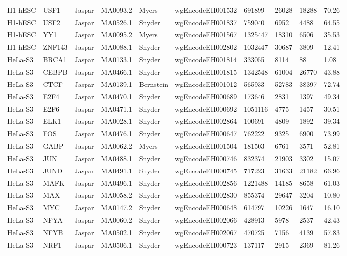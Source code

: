 {\begin{longtable}{p{1.1cm}p{1.0cm}p{1.0cm}p{1.0cm}p{1.0cm}p{2.3cm}p{1.0cm}p{0.8cm}p{0.8cm}p{0.8cm}}
H1-hESC & USF1 & Jaspar & MA0093.2 & Myers & wgEncodeEH001532 & 691899 & 26028 & 18288 & 70.26\\
H1-hESC & USF2 & Jaspar & MA0526.1 & Snyder & wgEncodeEH001837 & 759040 & 6952 & 4488 & 64.55\\
H1-hESC & YY1 & Jaspar & MA0095.2 & Myers & wgEncodeEH001567 & 1325447 & 18310 & 6506 & 35.53\\
H1-hESC & ZNF143 & Jaspar & MA0088.1 & Snyder & wgEncodeEH002802 & 1032447 & 30687 & 3809 & 12.41\\
HeLa-S3 & BRCA1 & Jaspar & MA0133.1 & Snyder & wgEncodeEH001814 & 333055 & 8114 & 88 & 1.08\\
HeLa-S3 & CEBPB & Jaspar & MA0466.1 & Snyder & wgEncodeEH001815 & 1342548 & 61004 & 26770 & 43.88\\
HeLa-S3 & CTCF & Jaspar & MA0139.1 & Bernstein & wgEncodeEH001012 & 565933 & 52783 & 38397 & 72.74\\
HeLa-S3 & E2F4 & Jaspar & MA0470.1 & Snyder & wgEncodeEH000689 & 173646 & 2831 & 1397 & 49.34\\
HeLa-S3 & E2F6 & Jaspar & MA0471.1 & Snyder & wgEncodeEH000692 & 1051116 & 4775 & 1457 & 30.51\\
HeLa-S3 & ELK1 & Jaspar & MA0028.1 & Snyder & wgEncodeEH002864 & 100691 & 4809 & 1892 & 39.34\\
HeLa-S3 & FOS & Jaspar & MA0476.1 & Snyder & wgEncodeEH000647 & 762222 & 9325 & 6900 & 73.99\\
HeLa-S3 & GABP & Jaspar & MA0062.2 & Myers & wgEncodeEH001504 & 181503 & 6761 & 3571 & 52.81\\
HeLa-S3 & JUN & Jaspar & MA0488.1 & Snyder & wgEncodeEH000746 & 832374 & 21903 & 3302 & 15.07\\
HeLa-S3 & JUND & Jaspar & MA0491.1 & Snyder & wgEncodeEH000745 & 717223 & 31633 & 21182 & 66.96\\
HeLa-S3 & MAFK & Jaspar & MA0496.1 & Snyder & wgEncodeEH002856 & 1221488 & 14185 & 8658 & 61.03\\
HeLa-S3 & MAX & Jaspar & MA0058.2 & Snyder & wgEncodeEH002830 & 855374 & 29647 & 3204 & 10.80\\
HeLa-S3 & MYC & Jaspar & MA0147.2 & Snyder & wgEncodeEH000648 & 614797 & 10226 & 1647 & 16.10\\
HeLa-S3 & NFYA & Jaspar & MA0060.2 & Snyder & wgEncodeEH002066 & 428913 & 5978 & 2537 & 42.43\\
HeLa-S3 & NFYB & Jaspar & MA0502.1 & Snyder & wgEncodeEH002067 & 470725 & 7156 & 4139 & 57.83\\
HeLa-S3 & NRF1 & Jaspar & MA0506.1 & Snyder & wgEncodeEH000723 & 137117 & 2915 & 2369 & 81.26\\

\end{longtable}}
